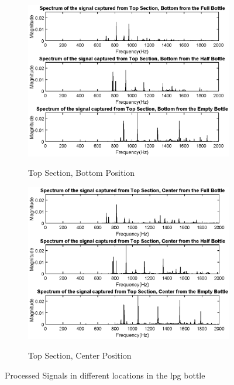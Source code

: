 \begin{figure}[]
    \begin{subfigure}{0.45\textwidth}
        \centering
        \includegraphics[width=\linewidth]{Chapters/6CHP/Figures/TopBot.eps}
        \caption{Top Section, Bottom Position}{}
        \label{subfig:TopBotMic}
    \end{subfigure}
    \begin{subfigure}{0.45\textwidth}
        \centering
        \includegraphics[width=\linewidth]{Chapters/6CHP/Figures/TopCenter.eps}
        \caption{Top Section, Center Position}{}
        \label{subfig:TopCenMic}
    \end{subfigure}
    \caption{Processed Signals in different locations in the \acrshort{lpg} bottle}{}
     \label{fig:ProcRealDataMic}
\end{figure}

